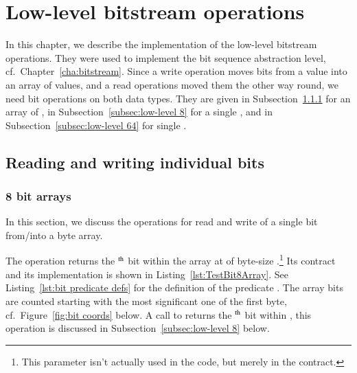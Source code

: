 
\chapter{Low-level bitstream operations}
\label{cha:low-level bitstream}

In this chapter, we describe the implementation of the
low-level bitstream operations.
%
They were used to implement the bit sequence abstraction level, cf.\
Chapter~\ref{cha:bitstream}.
%
Since a write operation moves bits from a  value
into an array of  values, and a read operations
moved them the other way round,
we need bit operations on both data types.
%
They are given in
Subsection~\ref{subsec:low-level 8 array} 
for an array of , 
in Subsection~\ref{subsec:low-level 8} for a single ,
and
in Subsection~\ref{subsec:low-level 64} for single .













\section{Reading and writing individual bits}


\subsection{8 bit arrays}
\label{subsec:low-level 8 array}


In this section, we discuss the operations for read and write of a
single bit from/into a byte array.

The operation  returns the
$^{\mbox{\scriptsize th}}$ bit
within the array at 
of byte-size .\footnote{
	This parameter isn't actually used in the code, but merely
	in the contract.
}
Its contract and its implementation is shown in
Listing~\ref{lst:TestBit8Array}.
%
See Listing~\ref{lst:bit predicate defs} for the definition of the predicate
\inl{Bit8Array}.
%
The array bits are counted starting with the most significant one of
the first byte,
cf.\ Figure~\ref{fig:bit coords} below.
%
A call to  returns the 
$^{\mbox{\scriptsize th}}$ bit
within , this operation is discussed in
Subsection~\ref{subsec:low-level 8} below.








